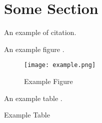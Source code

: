 
\section{Some Section}

An example of citation\cite{SomeCitation}.

An example figure .

\begin{figure}
	\centering
	\texttt{[image: example.png]}
	\caption{Example Figure \label{ExampleFigure}}
\end{figure}

An example table .

\begin{table}
	\centering
	\caption{Example Table\label{ExampleTable}}
\end{table}
